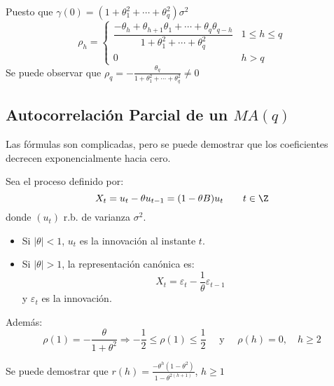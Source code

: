 Puesto que $\gamma \left( 0 \right)=(1+\theta_{1}^{2} +\cdots+\theta 
_{q}^{2} )\sigma^{2}$
\[
\rho_{h} =\begin{cases}
           \dfrac{-\theta_{h} +\theta_{h+1} \theta_{1} +\cdots+\theta_{q} \theta_{q-h} }{1+\theta_{1}^{2} +\cdots+\theta_{q}^{2} } & 1\le h\le q\\
            0 & h>q
          \end{cases}
\]
Se puede observar que $\rho_{q} =-\displaystyle\frac{\theta_{q} }{1+\theta_{1}^{2} +\cdots+\theta_{q}^{2} }\ne 0$

\subsection{Autocorrelaci\'{o}n Parcial de un $MA (q)$}

Las f\'{o}rmulas son complicadas, pero se puede demostrar que los coeficientes decrecen exponencialmente hacia cero.

\begin{ejemplo}
 Sea el proceso definido por:
\[
X_{t} =u_{t} -\theta u_{t-1} =(1-\theta B)u_{t} 
\qquad
t\in \Z
\]
donde $(u_{t} )$ r.b. de varianza $\sigma^{2}$.

\begin{itemize}
\item Si $\left| \theta \right|<1$, $u_{{t}}$ es la innovaci\'{o}n al instante $t$.
\item Si $\left| \theta \right|>1$, la representaci\'{o}n can\'{o}nica es:
\[
X_{t} =\varepsilon_{t} -\frac{1}{\theta }\varepsilon_{t-1} 
\]
y $\varepsilon_{t} $ es la innovaci\'{o}n.
\end{itemize}

Adem\'{a}s:
\[
 \rho \left( 1 \right)=-\frac{\theta }{1+\theta^{2}}\Rightarrow 
-\frac{1}{2}\le \rho \left( 1 \right)\le \frac{1}{2}\quad\text{ y }\quad\rho \left( h 
\right)=0, \quad h\ge 2
\]

Se puede demostrar que $r\left( h \right)=\frac{-\theta^{h}(1-\theta^{2})}{1-\theta^{2(h+1)}}$, $h\ge 1$
\end{ejemplo}

